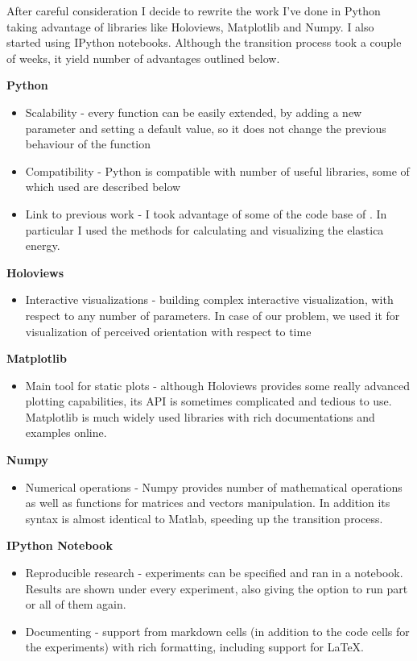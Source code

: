 After careful consideration I decide to rewrite the work I've done in Python taking advantage of libraries like Holoviews\cite{stevens2010holoviews}, Matplotlib\cite{hunter2007matplotlib} and Numpy. I also started using IPython notebooks\cite{shen2014interactive}. Although the transition process took a couple of weeks, it yield number of advantages outlined below.

\textbf{Python}
\begin{itemize}
  \item Scalability - every function can be easily extended, by adding a new parameter and setting a default value, so it does not change the previous behaviour of the function
  \item Compatibility - Python is compatible with number of useful libraries, some of which used are described below
  \item Link to previous work - I took advantage of some of the code base of \cite{keemink2015unified}. In particular I used the methods for calculating and visualizing the elastica energy.
\end{itemize}

\textbf{Holoviews}
\begin{itemize}
	\item Interactive visualizations - building complex interactive visualization, with respect to any number of parameters. In case of our problem, we used it for visualization of perceived orientation with respect to time
\end{itemize}

\textbf{Matplotlib}
\begin{itemize}
	\item Main tool for static plots - although Holoviews provides some really advanced plotting capabilities, its API is sometimes complicated and tedious to use. Matplotlib is much widely used libraries with rich documentations and examples online.
\end{itemize}

\textbf{Numpy}
\begin{itemize}
	\item Numerical operations - Numpy provides number of mathematical operations as well as functions for matrices and vectors manipulation. In addition its syntax is almost identical to Matlab, speeding up the transition process.
\end{itemize}

\textbf{IPython Notebook}
\begin{itemize}
	\item Reproducible research - experiments can be specified and ran in a notebook. Results are shown under every experiment, also giving the option to run part or all of them again.
	\item Documenting - support from markdown cells (in addition to the code cells for the experiments) with rich formatting, including support for LaTeX.
\end{itemize}

